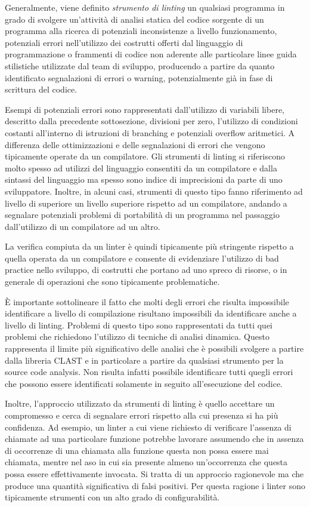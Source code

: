 Generalmente, viene definito \textit{strumento di linting} un qualsiasi
programma in grado di svolgere un'attività di analisi statica del codice
sorgente di un programma alla ricerca di potenziali inconsistenze a livello
funzionamento, potenziali errori nell'utilizzo dei costrutti offerti dal
linguaggio di programmazione o frammenti di codice non aderente alle particolare
linee guida stilistiche utilizzate dal team di sviluppo, producendo a partire da
quanto identificato segnalazioni di errori o warning, potenzialmente già in fase
di scrittura del codice.

Esempi di potenziali errori sono rappresentati dall'utilizzo di variabili
libere, descritto dalla precedente sottosezione, divisioni per zero, l'utilizzo
di condizioni costanti all'interno di istruzioni di branching e potenziali
overflow aritmetici. A differenza delle ottimizzazioni e delle segnalazioni di
errori che vengono tipicamente operate da un compilatore. Gli strumenti di
linting si riferiscono molto spesso ad utilizzi del linguaggio consentiti da un
compilatore e dalla sintassi del linguaggio ma spesso sono indice di
imprecisioni da parte di uno sviluppatore. Inoltre, in alcuni casi, strumenti di
questo tipo fanno riferimento ad livello di superiore un livello superiore
rispetto ad un compilatore, andando a segnalare potenziali problemi di
portabilità di un programma nel passaggio dall'utilizzo di un compilatore ad un
altro.

La verifica compiuta da un linter è quindi tipicamente più stringente rispetto a
quella operata da un compilatore e consente di evidenziare l'utilizzo di bad
practice nello sviluppo, di costrutti che portano ad uno spreco di risorse, o in
generale di operazioni che sono tipicamente problematiche.

È importante sottolineare il fatto che molti degli errori che risulta impossibile
identificare a livello di compilazione risultano impossibili da identificare
anche a livello di linting. Problemi di questo tipo sono rappresentati
da tutti quei problemi che richiedono l'utilizzo di tecniche di analisi
dinamica. Questo rappresenta il limite più significativo delle analisi che è
possibili svolgere a partire dalla libreria CLAST e in particolare a partire da
qualsiasi strumento per la source code analysis. Non risulta infatti possibile
identificare tutti quegli errori che possono essere identificati solamente in
seguito all'esecuzione del codice.

Inoltre, l'approccio utilizzato da strumenti di linting è quello accettare un
compromesso e cerca di segnalare errori rispetto alla cui presenza si ha più
confidenza. Ad esempio, un linter a cui viene richiesto di verificare l'assenza
di chiamate ad una particolare funzione potrebbe lavorare assumendo che in
assenza di occorrenze di una chiamata alla funzione questa non possa essere mai
chiamata, mentre nel aso in cui sia presente almeno un'occorrenza che questa
possa essere effettivamente invocata. Si tratta di un approccio ragionevole ma
che produce una quantità significativa di falsi positivi. Per questa ragione i
linter sono tipicamente strumenti con un alto grado di configurabilità.

